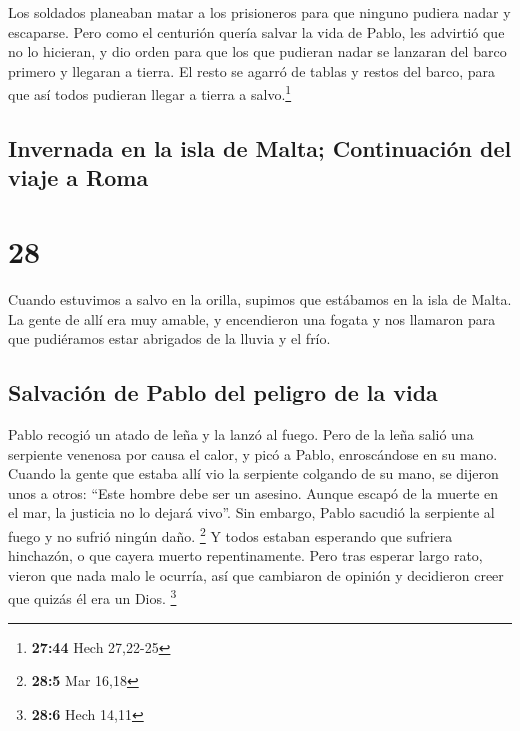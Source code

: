  Los soldados planeaban matar a los prisioneros para que
ninguno pudiera nadar y escaparse.  Pero como el
centurión quería salvar la vida de Pablo, les advirtió que no lo
hicieran, y dio orden para que los que pudieran nadar se lanzaran del
barco primero y llegaran a tierra.  El resto se agarró de
tablas y restos del barco, para que así todos pudieran llegar a tierra a
salvo.\footnote{\textbf{27:44} Hech 27,22-25}

\hypertarget{invernada-en-la-isla-de-malta-continuaciuxf3n-del-viaje-a-roma}{%
\subsection{Invernada en la isla de Malta; Continuación del viaje a
Roma}\label{invernada-en-la-isla-de-malta-continuaciuxf3n-del-viaje-a-roma}}

\hypertarget{section-27}{%
\section{28}\label{section-27}}

 Cuando estuvimos a salvo en la orilla, supimos que
estábamos en la isla de Malta.  La gente de allí era muy
amable, y encendieron una fogata y nos llamaron para que pudiéramos
estar abrigados de la lluvia y el frío.

\hypertarget{salvaciuxf3n-de-pablo-del-peligro-de-la-vida}{%
\subsection{Salvación de Pablo del peligro de la
vida}\label{salvaciuxf3n-de-pablo-del-peligro-de-la-vida}}

 Pablo recogió un atado de leña y la lanzó al fuego. Pero
de la leña salió una serpiente venenosa por causa el calor, y picó a
Pablo, enroscándose en su mano.  Cuando la gente que
estaba allí vio la serpiente colgando de su mano, se dijeron unos a
otros: ``Este hombre debe ser un asesino. Aunque escapó de la muerte en
el mar, la justicia no lo dejará vivo''.  Sin embargo,
Pablo sacudió la serpiente al fuego y no sufrió ningún daño. \footnote{\textbf{28:5}
  Mar 16,18}  Y todos estaban esperando que sufriera
hinchazón, o que cayera muerto repentinamente. Pero tras esperar largo
rato, vieron que nada malo le ocurría, así que cambiaron de opinión y
decidieron creer que quizás él era un Dios. \footnote{\textbf{28:6} Hech
  14,11}

